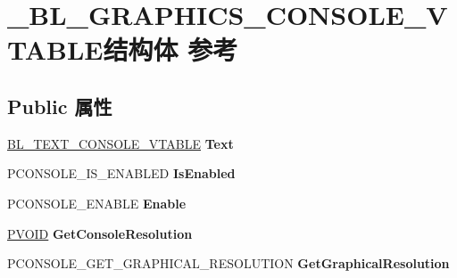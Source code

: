 \hypertarget{struct___b_l___g_r_a_p_h_i_c_s___c_o_n_s_o_l_e___v_t_a_b_l_e}{}\section{\+\_\+\+B\+L\+\_\+\+G\+R\+A\+P\+H\+I\+C\+S\+\_\+\+C\+O\+N\+S\+O\+L\+E\+\_\+\+V\+T\+A\+B\+L\+E结构体 参考}
\label{struct___b_l___g_r_a_p_h_i_c_s___c_o_n_s_o_l_e___v_t_a_b_l_e}
\subsection*{Public 属性}
\begin{DoxyCompactItemize}
\item 
\mbox{\label{struct___b_l___g_r_a_p_h_i_c_s___c_o_n_s_o_l_e___v_t_a_b_l_e_a15e2f7bdbe1fabcb87e206ac51bf003d}} 
\hyperlink{struct___b_l___t_e_x_t___c_o_n_s_o_l_e___v_t_a_b_l_e}{B\+L\+\_\+\+T\+E\+X\+T\+\_\+\+C\+O\+N\+S\+O\+L\+E\+\_\+\+V\+T\+A\+B\+LE} {\bfseries Text}
\item 
\mbox{\label{struct___b_l___g_r_a_p_h_i_c_s___c_o_n_s_o_l_e___v_t_a_b_l_e_a073b87462484384218f0c5425223f303}} 
P\+C\+O\+N\+S\+O\+L\+E\+\_\+\+I\+S\+\_\+\+E\+N\+A\+B\+L\+ED {\bfseries Is\+Enabled}
\item 
\mbox{\label{struct___b_l___g_r_a_p_h_i_c_s___c_o_n_s_o_l_e___v_t_a_b_l_e_a59ae7dc1714b0420e63243522432c923}} 
P\+C\+O\+N\+S\+O\+L\+E\+\_\+\+E\+N\+A\+B\+LE {\bfseries Enable}
\item 
\mbox{\label{struct___b_l___g_r_a_p_h_i_c_s___c_o_n_s_o_l_e___v_t_a_b_l_e_adbe88e053757bdb64c8b7f4823455121}} 
\hyperlink{interfacevoid}{P\+V\+O\+ID} {\bfseries Get\+Console\+Resolution}
\item 
\mbox{\label{struct___b_l___g_r_a_p_h_i_c_s___c_o_n_s_o_l_e___v_t_a_b_l_e_a8e679fae2cdc7dde9fd233e288266108}} 
P\+C\+O\+N\+S\+O\+L\+E\+\_\+\+G\+E\+T\+\_\+\+G\+R\+A\+P\+H\+I\+C\+A\+L\+\_\+\+R\+E\+S\+O\+L\+U\+T\+I\+ON {\bfseries Get\+Graphical\+Resolution}

\end{DoxyCompactItemize}

